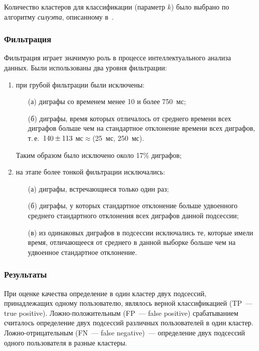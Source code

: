 \begin{multicols}{2}
Количество кластеров для классификации (параметр $k$) было выбрано по алгоритму 
\textit{силуэта}, описанному в~\cite{sil}.

\subsubsection{Фильтрация}

Фильтрация играет значимую роль в процессе интеллектуального анализа данных. 
Были использованы два уровня фильтрации:
\begin{enumerate}[(1)]
    \item при грубой фильтрации были исключены:
    \begin{itemize}
        \item[(а)] диграфы со временем менее 10 и более 750~мс;
        \item[(б)] диграфы, время которых отличалось от среднего времени всех диграфов 
        больше чем на стандартное отклонение времени всех диграфов, т.\,е.\ 
        $140\hm\pm 113~$мс\;$\approx$\;(25~мс, 250~мс).
    \end{itemize}
     Таким образом было исключено около 17\% диграфов;
    \item на этапе более тонкой фильтрации исключались:
    \begin{itemize}
        \item[(а)] диграфы, встречающиеся только один раз;
        \item[(б)] диграфы, у которых стандартное отклонение больше 
        удвоенного среднего стандартного отклонения всех диграфов данной подсессии;
        \item[(в)] из одинаковых диграфов в подсессии исключались те, которые имели 
        время, отличающееся от среднего в данной выборке больше чем на удвоенное 
        стандартное отклонение.
    \end{itemize}
\end{enumerate}

\subsubsection{Результаты}

При оценке качества определение в один клас\-тер двух подсессий,
принадлежащих одному пользователю, являлось верной классификацией\linebreak
(TP~--- true positive). Ложно-положительным (FP~--- false positive)
срабатыванием считалось определение двух подсессий различных
пользователей в один кластер. Лож\-но-от\-ри\-ца\-тель\-ным (FN~--- false
negative)~--- определение двух подсессий одного пользователя в разные
кластеры.


\end{multicols}
